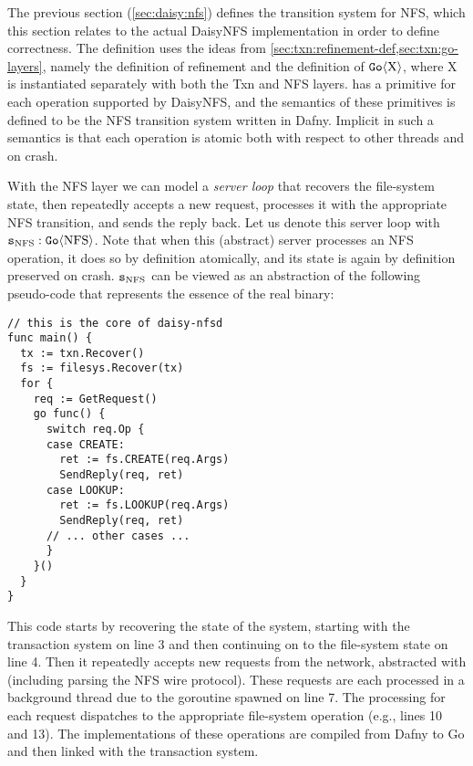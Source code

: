 The previous section (\cref{sec:daisy:nfs}) defines the transition system for NFS,
which this section relates to the actual DaisyNFS implementation in order to
define correctness. The definition uses the ideas from
\cref{sec:txn:refinement-def,sec:txn:go-layers}, namely the definition of
refinement and the definition of $\mathtt{Go}\langle \mathrm{X} \rangle$, where X is instantiated
separately with both the Txn and NFS layers.  has a primitive for each operation supported by
DaisyNFS, and the semantics of these primitives is defined to be the NFS
transition system written in Dafny. Implicit in such a semantics is that each
operation is atomic both with respect to other threads and on crash.

With the NFS layer we can model a \emph{server loop} that recovers the
file-system state, then repeatedly accepts a new request, processes it with the
appropriate NFS transition, and sends the reply back. Let us denote this server
loop with $\texttt{s}_{\mathrm{NFS}} : \mathtt{Go}\langle \mathrm{NFS} \rangle$. Note that when this (abstract) server
processes an NFS operation, it does so by definition atomically, and its state
is again by definition preserved on crash. $\texttt{s}_{\mathrm{NFS}}$ can be viewed as an
abstraction of the following pseudo-code that represents the essence of the
real  binary:

\begin{verbatim}
// this is the core of daisy-nfsd
func main() {
  tx := txn.Recover()
  fs := filesys.Recover(tx)
  for {
    req := GetRequest()
    go func() {
      switch req.Op {
      case CREATE:
        ret := fs.CREATE(req.Args)
        SendReply(req, ret)
      case LOOKUP:
        ret := fs.LOOKUP(req.Args)
        SendReply(req, ret)
      // ... other cases ...
      }
    }()
  }
}
\end{verbatim}

This code starts by recovering the state of the system, starting with the
transaction system on line 3 and then continuing on to the file-system state on
line 4. Then it repeatedly accepts new requests from the network, abstracted
with  (including parsing the NFS wire protocol). These requests
are each processed in a background thread due to the goroutine spawned on line
7. The processing for each request dispatches to the appropriate file-system
operation (e.g., lines 10 and 13). The implementations of these operations are
compiled from Dafny to Go and then linked with the transaction system.

